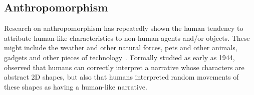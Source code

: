 \documentclass{article}
\theoremstyle{plain}
\theoremstyle{definition}
\theoremstyle{remark}
\begin{document}

\subsection{Anthropomorphism}

Research on anthropomorphism has repeatedly shown the human tendency to attribute human-like characteristics to non-human agents and/or objects. These might include the weather and other natural forces, pets and other animals, gadgets and other pieces of technology~\cite{epley2007seeing}. Formally studied as early as 1944,~\cite{heider1944experimental} observed that humans can correctly interpret a narrative whose characters are abstract 2D shapes, but also that humans interpreted random movements of these shapes as having a human-like narrative. 
\end{document}
